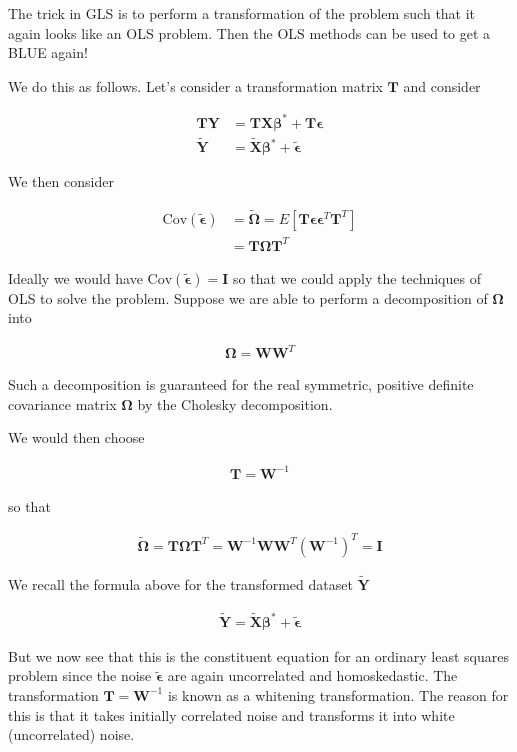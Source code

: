 \documentclass[12pt]{article}
\newcommand{\ep}{\epsilon}
\newcommand{\bv}[1]{\boldsymbol{#1}}
\begin{document}
The trick in GLS is to perform a transformation of the problem such that it again looks like an OLS problem. Then the OLS methods can be used to get a BLUE again!

We do this as follows. Let's consider a transformation matrix $\bv{T}$ and consider

\begin{align}
\bv{T}\bv{Y} &= \bv{T}\bv{X}\bv{\beta^*} + \bv{T}\bv{\ep}\\
\bv{\tilde{Y}} &= \bv{\tilde{X}}\bv{\beta^*} + \bv{\tilde{\ep}}
\end{align}

We then consider

\begin{align}
\text{Cov}(\bv{\tilde{\ep}}) &= \bv{\tilde{\Omega}} =  E\left[\bv{T}\bv{\ep}\bv{\ep}^T\bv{T}^T\right]\\
&= \bv{T}\bv{\Omega}\bv{T}^T
\end{align}

Ideally we would have $\text{Cov}(\bv{\tilde{\ep}}) = \bv{I}$ so that we could apply the techniques of OLS to solve the problem.
Suppose we are able to perform a decomposition of $\bv{\Omega}$ into

\begin{align}
\bv{\Omega} = \bv{W}\bv{W}^T
\end{align}

Such a decomposition is guaranteed for the real symmetric, positive definite covariance matrix $\bv{\Omega}$ by the Cholesky decomposition.

We would then choose

\begin{align}
\bv{T} = \bv{W}^{-1}
\end{align}

so that

\begin{align}
\bv{\tilde{\Omega}} = \bv{T}\bv{\Omega}\bv{T}^T = \bv{W}^{-1}\bv{W}\bv{W}^T (\bv{W}^{-1})^T = \bv{I}
\end{align}

We recall the formula above for the transformed dataset $\bv{\tilde{Y}}$

\begin{align}
\bv{\tilde{Y}} = \bv{\tilde{X}}\bv{\beta^*} + \bv{\tilde{\ep}}
\end{align}

But we now see that this is the constituent equation for an ordinary least squares problem since the noise $\bv{\tilde{\ep}}$ are again uncorrelated and homoskedastic. 
The transformation $\bv{T} = \bv{W}^{-1}$ is known as a whitening transformation. The reason for this is that it takes initially correlated noise and transforms it into white (uncorrelated) noise.
\end{document}
